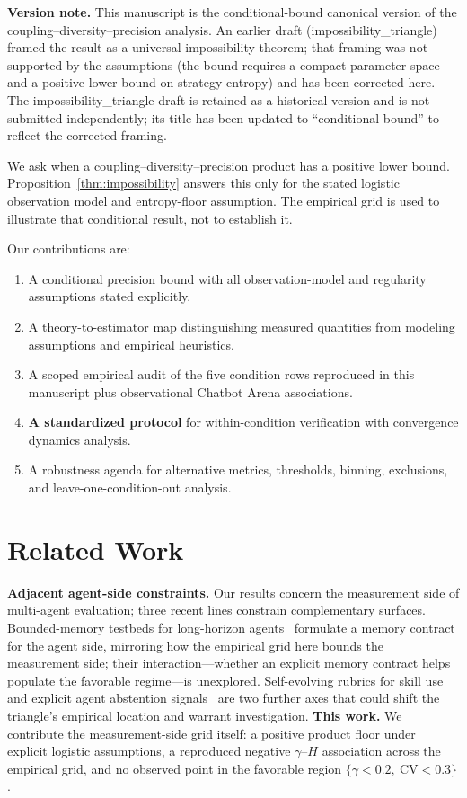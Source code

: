 \documentclass[11pt]{article}
\begin{document}
\textbf{Version note.} This manuscript is the conditional-bound canonical version of the coupling--diversity--precision analysis. An earlier draft (impossibility\_triangle) framed the result as a universal impossibility theorem; that framing was not supported by the assumptions (the bound requires a compact parameter space and a positive lower bound on strategy entropy) and has been corrected here. The impossibility\_triangle draft is retained as a historical version and is not submitted independently; its title has been updated to ``conditional bound'' to reflect the corrected framing.

We ask when a coupling--diversity--precision product has a positive lower bound. Proposition~\ref{thm:impossibility} answers this only for the stated logistic observation model and entropy-floor assumption. The empirical grid is used to illustrate that conditional result, not to establish it.

Our contributions are:
\begin{enumerate}[leftmargin=*,nosep]
 \item A conditional precision bound with all observation-model and regularity assumptions stated explicitly.
 \item A theory-to-estimator map distinguishing measured quantities from modeling assumptions and empirical heuristics.
 \item A scoped empirical audit of the five condition rows reproduced in this manuscript plus observational Chatbot Arena associations.
 \item \textbf{A standardized protocol} for within-condition verification with convergence dynamics analysis.
 \item A robustness agenda for alternative metrics, thresholds, binning, exclusions, and leave-one-condition-out analysis.
\end{enumerate}

\section{Related Work}



\textbf{Adjacent agent-side constraints.} Our results concern the
measurement side of multi-agent evaluation; three recent lines constrain
complementary surfaces. Bounded-memory testbeds for long-horizon
agents~\cite{cheng2026agenticsts} formulate a memory contract for the agent
side, mirroring how the empirical grid here bounds the measurement side;
their interaction---whether an explicit memory contract helps populate the
favorable regime---is unexplored. Self-evolving rubrics for skill
use~\cite{zhu2026skillcoach} and explicit agent abstention
signals~\cite{luo2026abstention} are two further axes that could shift the
triangle's empirical location and warrant investigation. \textbf{This
work.} We contribute the measurement-side grid itself: a positive product
floor under explicit logistic assumptions, a reproduced negative
$\gamma$--$H$ association across the empirical grid, and no observed point
in the favorable region $\{\gamma < 0.2,\ \mathrm{CV} < 0.3\}$.
\end{document}
